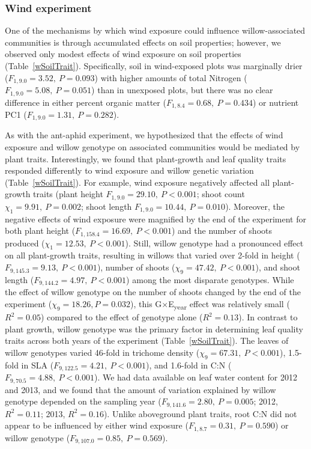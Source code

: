 \documentclass[11pt]{article}
\begin{document}
\subsubsection*{Wind experiment}

One of the mechanisms by which wind exposure could influence
willow-associated communities is through accumulated effects on soil
properties; however, we observed only modest effects of wind exposure on
soil properties (Table~\ref{wSoilTrait}). Specifically, soil in wind-exposed plots was
marginally drier (\(F_{1,9.0}=3.52,\ P=0.093\)) with higher amounts of total
Nitrogen (\(F_{1,9.0}=5.08,\ P=0.051\)) than in unexposed plots, but there was no
clear difference in either percent organic matter (\(F_{1,8.4}=0.68,\ P=0.434\)) or
nutrient PC1 (\(F_{1,9.0}=1.31,\ P=0.282\)).

As with the ant-aphid experiment, we hypothesized that the effects of
wind exposure and willow genotype on associated communities would be
mediated by plant traits. Interestingly, we found that plant-growth and
leaf quality traits responded differently to wind exposure and willow
genetic variation (Table~\ref{wSoilTrait}). For example, wind exposure negatively
affected all plant-growth traits (plant height \(F_{1,9.0}=29.10,\ P<0.001\); shoot
count \(\chi_1=9.91,\ P=0.002\); shoot length \(F_{1,9.0}=10.44,\ P=0.010\)). Moreover, the
negative effects of wind exposure were magnified by the end of the
experiment for both plant height (\(F_{1,158.4}=16.69,\ P<0.001\)) and the number of
shoots produced (\(\chi_1=12.53,\ P<0.001\)). Still, willow genotype had a
pronounced effect on all plant-growth traits, resulting in willows that
varied over 2-fold in height (\(F_{9,145.3}=9.13,\ P<0.001\)), number of shoots
(\(\chi_9=47.42,\ P<0.001\)), and shoot length (\(F_{9,144.2}=4.97,\ P<0.001\)) among the most
disparate genotypes. While the effect of willow genotype on the number
of shoots changed by the end of the experiment (\(\chi_9=18.26, P = 0.032\)),
this G$\times$E\textsubscript{year} effect was relatively small (\(R^2=0.05\))
compared to the effect of genotype alone (\(R^2=0.13\)). In
contrast to plant growth, willow genotype was the primary factor
in determining leaf quality traits across both years of the experiment (Table~\ref{wSoilTrait}). The leaves of willow genotypes varied 46-fold in trichome density
(\(\chi_9=67.31,\ P<0.001\)), 1.5-fold in SLA (\(F_{9,122.5}=4.21,\ P<0.001\)), and 1.6-fold
in C:N (\(F_{9,70.5}=4.88,\ P<0.001\)). We had data available on leaf water content
for 2012 and 2013, and we found that the amount of variation explained
by willow genotype depended on the sampling year (\(F_{9,141.6}=2.80,\ P=0.005\);
2012, \(R^2=0.11\); 2013, \(R^2=0.16\)). Unlike aboveground
plant traits, root C:N did not appear to be influenced by either wind
exposure (\(F_{1,8.7}=0.31,\ P=0.590\)) or willow genotype (\(F_{9,107.0}=0.85,\ P=0.569\)).
\end{document}
